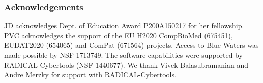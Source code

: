 \subsubsection*{Acknowledgements}

{\footnotesize JD acknowledges Dept. of Education Award P200A150217 for her
fellowship. PVC acknowledges the support of the EU H2020 CompBioMed (675451),
EUDAT2020 (654065) and ComPat (671564) projects. Access to Blue Waters was
made possible by NSF 1713749. The software capabilities were supported by
RADICAL-Cybertools (NSF 1440677). We thank Vivek Balasubramanian and Andre
Merzky for support with RADICAL-Cybertools.}
